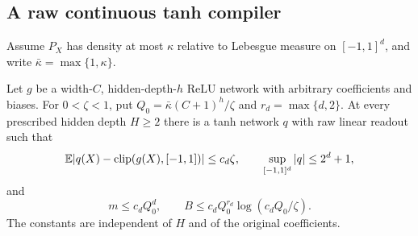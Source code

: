 \subsection{A raw continuous tanh compiler}
Assume $P_X$ has density at most $\kappa$ relative to Lebesgue measure on
$[-1,1]^d$, and write $\bar\kappa=\max\{1,\kappa\}$.
\begin{lemma}\label{lem:raw-continuous-tanh}
Let $g$ be a width-$C$, hidden-depth-$h$ ReLU network with arbitrary
coefficients and biases.  For $0<\zeta<1$, put
$Q_0=\bar\kappa(C+1)^h/\zeta$ and $r_d=\max\{d,2\}$.
At every prescribed hidden depth $H\ge2$ there is a tanh network $q$
with raw linear readout such that
\[
 \mathbb E|q(X)-\operatorname{clip}(g(X),[-1,1])|\le c_d\zeta,
 \qquad \sup_{[-1,1]^d}|q|\le2^d+1,
\]
and
\[
 m\le c_d Q_0^d,\qquad
 B\le c_d Q_0^{r_d}\log(c_dQ_0/\zeta).
\]
The constants are independent of $H$ and of the original coefficients.
\end{lemma}
